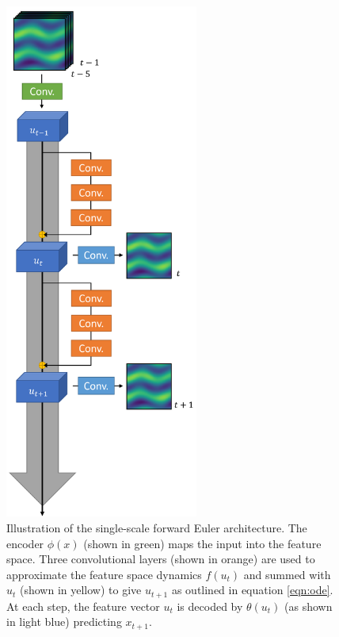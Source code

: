 \documentclass[12pt]{article}
\theoremstyle{plain}
\theoremstyle{remark}
\theoremstyle{definition}
\begin{document}
\begin{figure}
	\begin{minipage}[c]{0.45\textwidth}
		\centering
		\includegraphics[width=2.5in]{pde_arch}
		\caption{Illustration of the single-scale forward Euler architecture. The encoder $\phi(x)$ (shown in green) maps the input into the feature space. Three convolutional layers (shown in orange) are used to approximate the feature space dynamics $f(u_t)$ and summed with $u_t$ (shown in yellow) to give $u_{t+1}$ as outlined in equation \ref{eqn:ode}. At each step, the feature vector $u_t$ is decoded by $\theta(u_t)$ (as shown in light blue) predicting $x_{t+1}$.}
		\label{fig:arch}


\end{minipage}
\end{figure}
\end{document}
